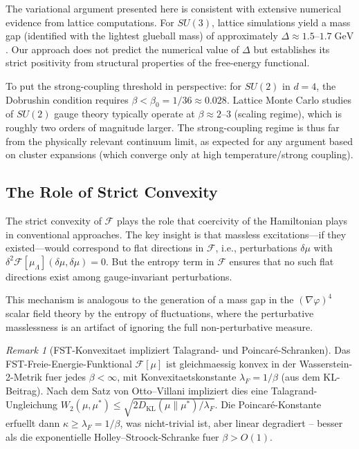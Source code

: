 \documentclass[12pt,a4paper]{article}
\theoremstyle{definition}
\theoremstyle{plain}
\theoremstyle{remark}
\newtheorem{remark}[definition]{Remark}
\begin{document}
The variational argument presented here is consistent with extensive numerical evidence from lattice computations. For $SU(3)$, lattice simulations yield a mass gap (identified with the lightest glueball mass) of approximately $\Delta \approx 1.5$--$1.7\;\mathrm{GeV}$ \cite{MorningstonPeardon1999, ChenXu2006}. Our approach does not predict the numerical value of $\Delta$ but establishes its strict positivity from structural properties of the free-energy functional.

To put the strong-coupling threshold in perspective: for $SU(2)$ in $d=4$, the Dobrushin condition requires $\beta < \beta_0 = 1/36 \approx 0.028$. Lattice Monte Carlo studies of $SU(2)$ gauge theory typically operate at $\beta \approx 2$--$3$ (scaling regime), which is roughly two orders of magnitude larger. The strong-coupling regime is thus far from the physically relevant continuum limit, as expected for any argument based on cluster expansions (which converge only at high temperature/strong coupling).

\subsection{The Role of Strict Convexity}

The strict convexity of $\mathcal{F}$ plays the role that coercivity of the Hamiltonian plays in conventional approaches. The key insight is that massless excitations---if they existed---would correspond to flat directions in $\mathcal{F}$, i.e., perturbations $\delta\mu$ with $\delta^2 \mathcal{F}[\mu_\Lambda](\delta\mu, \delta\mu) = 0$. But the entropy term in $\mathcal{F}$ ensures that no such flat directions exist among gauge-invariant perturbations.

This mechanism is analogous to the generation of a mass gap in the $(\nabla\varphi)^4$ scalar field theory by the entropy of fluctuations, where the perturbative masslessness is an artifact of ignoring the full non-perturbative measure.

\begin{remark}[FST-Konvexitaet impliziert Talagrand- und Poincar\'e-Schranken]
\label{rem:fst-convexity-talagrand}
Das FST-Freie-Energie-Funktional $\mathcal{F}[\mu]$ ist gleichmaessig konvex in der Wasserstein-2-Metrik fuer jedes $\beta < \infty$, mit Konvexitaetskonstante $\lambda_F = 1/\beta$ (aus dem KL-Beitrag). Nach dem Satz von Otto--Villani impliziert dies eine Talagrand-Ungleichung $W_2(\mu, \mu^*) \leq \sqrt{2 D_{\mathrm{KL}}(\mu \| \mu^*) / \lambda_F}$. Die Poincar\'e-Konstante erfuellt dann $\kappa \geq \lambda_F = 1/\beta$, was nicht-trivial ist, aber linear degradiert -- besser als die exponentielle Holley--Stroock-Schranke fuer $\beta > O(1)$.
\end{remark}
\end{document}
